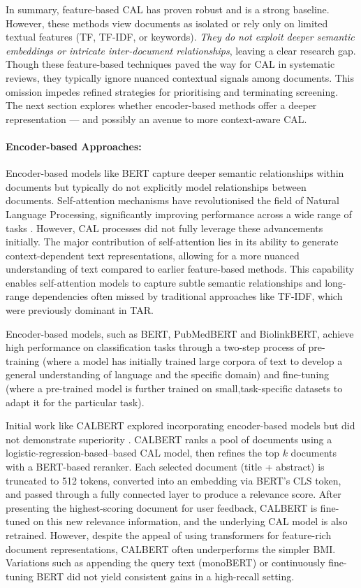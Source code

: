 \documentclass[10pt, english]{article}
\begin{document}
In summary, feature-based CAL has proven robust and is a strong baseline.  However, these methods view documents as isolated or rely only on limited textual features (TF, TF-IDF, or keywords). \emph{They do not exploit deeper semantic embeddings or intricate inter-document relationships}, leaving a clear research gap. Though these feature-based techniques paved the way for CAL in systematic reviews, they typically ignore nuanced contextual signals among documents. This omission impedes refined strategies for prioritising and terminating screening. The next section explores whether encoder-based methods offer a deeper representation — and possibly an avenue to more context-aware CAL.

\paragraph{Encoder-based Approaches: }

Encoder-based models like BERT capture deeper semantic relationships within documents but typically do not explicitly model relationships between documents. Self-attention mechanisms have revolutionised the field of Natural Language Processing, significantly improving performance across a wide range of tasks \cite{vaswani_attention_2023}. However, CAL processes did not fully leverage these advancements initially. The major contribution of self-attention lies in its ability to generate context-dependent text representations, allowing for a more nuanced understanding of text compared to earlier feature-based methods. This capability enables self-attention models to capture subtle semantic relationships and long-range dependencies often missed by traditional approaches like TF-IDF, which were previously dominant in TAR.

Encoder-based models, such as BERT, PubMedBERT and BiolinkBERT, achieve high performance on classification tasks through a two-step process of pre-training (where a model has initially trained large corpora of text to develop a general understanding of language and the specific domain) and fine-tuning (where a pre-trained model is further trained on small,task-specific datasets to adapt it for the particular task). 

Initial work like CALBERT explored incorporating encoder-based models but did not demonstrate superiority \cite{sadri_continuous_2022}. CALBERT ranks a pool of documents using a logistic-regression-based–based CAL model, then refines the top $k$ documents with a BERT-based reranker. Each selected document (title + abstract) is truncated to 512 tokens, converted into an embedding via BERT's CLS token, and passed through a fully connected layer to produce a relevance score. After presenting the highest-scoring document for user feedback, CALBERT is fine-tuned on this new relevance information, and the underlying CAL model is also retrained. However, despite the appeal of using transformers for feature-rich document representations, CALBERT often underperforms the simpler BMI. Variations such as appending the query text (monoBERT) or continuously fine-tuning BERT did not yield consistent gains in a high-recall setting. 
\end{document}
